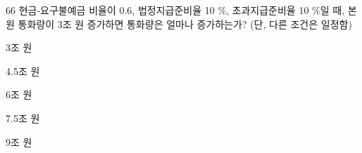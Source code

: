 \begin{question}{66}
현금-요구불예금 비율이 0.6, 법정지급준비율 10 \%, 초과지급준비율 10 \%일 때, 본원 통화량이 3조 원 증가하면 통화량은 얼마나 증가하는가? (단, 다른 조건은 일정함)
\begin{choices}
  \item 3조 원
  \item 4.5조 원
  \item 6조 원
  \item 7.5조 원
  \item 9조 원
\end{choices}
\end{question}

